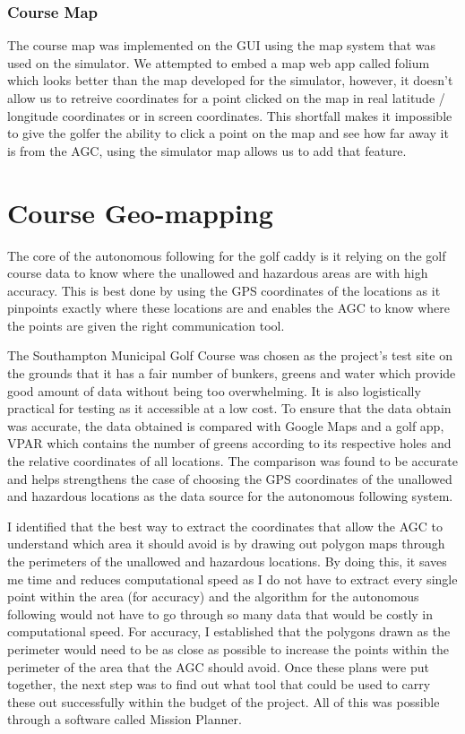\documentclass[11pt,landscape]{article}
\begin{document}
\begin{multicols}{3}
\subsubsection{Course Map}
The course map was implemented on the GUI using the map system that was used on
the simulator. We attempted to embed a map web app called folium which looks
better than the map developed for the simulator, however, it doesn't allow us to
retreive coordinates for a point clicked on the map in real latitude / longitude
coordinates or in screen coordinates. This shortfall makes it impossible to give
the golfer the ability to click a point on the map and see how far away it is
from the AGC, using the simulator map allows us to add that feature.

\section{Course Geo-mapping}
The core of the autonomous following for the golf caddy is it relying on the
golf course data to know where the unallowed and hazardous areas are with high
accuracy. This is best done by using the GPS coordinates of the locations as it
pinpoints exactly where these locations are and enables the AGC to know where
the points are given the right communication tool.

The Southampton Municipal Golf Course was chosen as the project’s test site on
the grounds that it has a fair number of bunkers, greens and water which provide
good amount of data without being too overwhelming. It is also logistically
practical for testing as it accessible at a low cost. To ensure that the data
obtain was accurate, the data obtained is compared with Google Maps and a golf
app, VPAR which contains the number of greens according to its respective holes
and the relative coordinates of all locations. The comparison was found to be
accurate and helps strengthens the case of choosing the GPS coordinates of the
unallowed and hazardous locations as the data source for the autonomous
following system. 

 I identified that the best way to extract the coordinates that allow
the AGC to understand which area it should avoid is by drawing out polygon
maps through the perimeters of the unallowed and hazardous locations. By doing
this, it saves me time and reduces computational speed as I do not have to
extract every single point within the area (for accuracy) and the algorithm for
the autonomous following would not have to go through so many data that would be
costly in computational speed. For accuracy, I established that the polygons
drawn as the perimeter would need to be as close as possible to increase the
points within the perimeter of the area that the AGC should avoid. Once
these plans were put together, the next step was to find out what tool that
could be used to carry these out successfully within the budget of the project.
All of this was possible through a software called Mission Planner.


\end{multicols}
\end{document}
